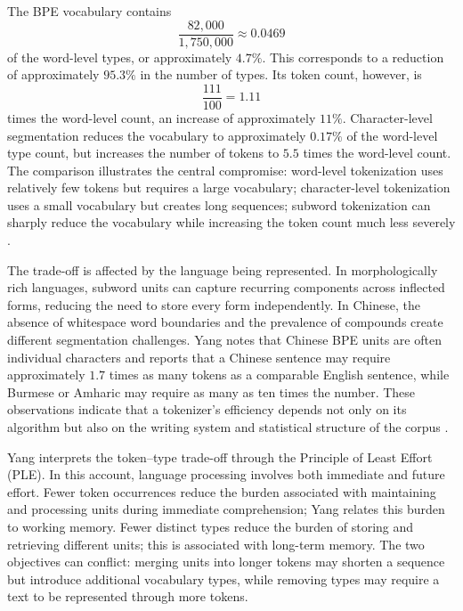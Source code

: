 The BPE vocabulary contains
\begin{equation}
    \frac{82{,}000}{1{,}750{,}000}
    \approx 0.0469
    \label{eq:tokenizer-bpe-type-ratio}
\end{equation}
of the word-level types, or approximately \(4.7\%\). This corresponds to a reduction of approximately \(95.3\%\) in the number of types. Its token count, however, is
\begin{equation}
    \frac{111}{100}=1.11
    \label{eq:tokenizer-bpe-token-ratio}
\end{equation}
times the word-level count, an increase of approximately \(11\%\). Character-level segmentation reduces the vocabulary to approximately \(0.17\%\) of the word-level type count, but increases the number of tokens to \(5.5\) times the word-level count. The comparison illustrates the central compromise: word-level tokenization uses relatively few tokens but requires a large vocabulary; character-level tokenization uses a small vocabulary but creates long sequences; subword tokenization can sharply reduce the vocabulary while increasing the token count much less severely \parencite{yang2024rethinking}.

The trade-off is affected by the language being represented. In morphologically rich languages, subword units can capture recurring components across inflected forms, reducing the need to store every form independently. In Chinese, the absence of whitespace word boundaries and the prevalence of compounds create different segmentation challenges. Yang notes that Chinese BPE units are often individual characters and reports that a Chinese sentence may require approximately \(1.7\) times as many tokens as a comparable English sentence, while Burmese or Amharic may require as many as ten times the number. These observations indicate that a tokenizer's efficiency depends not only on its algorithm but also on the writing system and statistical structure of the corpus \parencite{yang2024rethinking}.

Yang interprets the token--type trade-off through the Principle of Least Effort (PLE). In this account, language processing involves both immediate and future effort. Fewer token occurrences reduce the burden associated with maintaining and processing units during immediate comprehension; Yang relates this burden to working memory. Fewer distinct types reduce the burden of storing and retrieving different units; this is associated with long-term memory. The two objectives can conflict: merging units into longer tokens may shorten a sequence but introduce additional vocabulary types, while removing types may require a text to be represented through more tokens.

